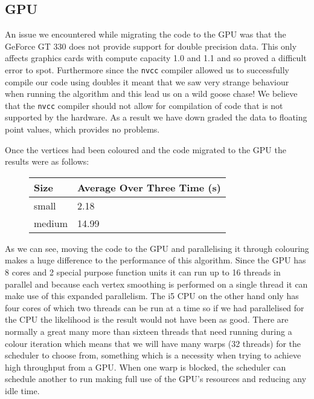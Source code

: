 \subsection{GPU}
An issue we encountered while migrating the code to the GPU was that the GeForce GT 330 does not provide support for double precision data. This only affects graphics cards with compute capacity 1.0 and 1.1 and so proved a difficult error to spot. Furthermore since the \verb!nvcc! compiler allowed us to successfully compile our code using doubles it meant that we saw very strange behaviour when running the algorithm and this lead us on a wild goose chase! We believe that the \verb!nvcc! compiler should not allow for compilation of code that is not supported by the hardware.
As a result we have down graded the data to floating point values, which provides no problems.

Once the vertices had been coloured and the code migrated to the GPU the results were as follows:\\

\begin{figure}[H]\centering \begin{tabular}{ l | l }
  \hline
  Size & Average Over Three Time (s) \\
  \hline
  \hline
  small & 2.18 \\
  medium & 14.99 \\
  \hline
\end{tabular} \end{figure}

As we can see, moving the code to the GPU and parallelising it through colouring makes a huge difference to the performance of this algorithm. Since the GPU has 8 cores and 2 special purpose function units it can run up to 16 threads in parallel and because each vertex smoothing is performed on a single thread it can make use of this expanded parallelism. The i5 CPU on the other hand only has four cores of which two threads can be run at a time so if we had parallelised for the CPU the likelihood is the result would not have been as good. There are normally a great many more than sixteen threads that need running during a colour iteration which means that we will have many warps (32 threads) for the scheduler to choose from, something which is a necessity when trying to achieve high throughput from a GPU. When one warp is blocked, the scheduler can schedule another to run making full use of the GPU's resources and reducing any idle time.

